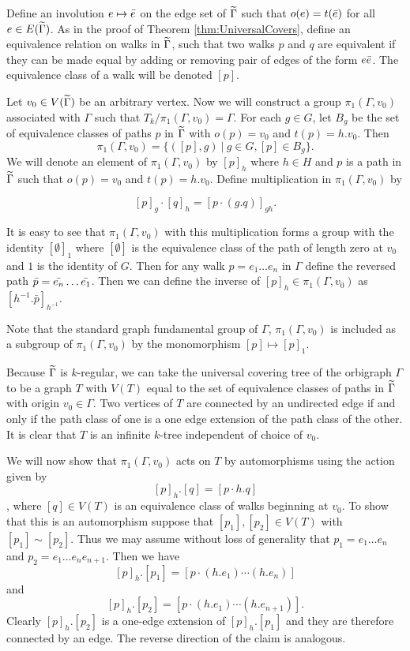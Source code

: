 Define an involution $e \mapsto \bar{e}$ on the edge set of $\widetilde{\Gamma}$ such that $o(e) = t(\bar{e})$ for all $e \in E(\widetilde{\Gamma})$. As in the proof of Theorem \ref{thm:UniversalCovers}, define an equivalence relation on walks in $\widetilde{\Gamma}$, such that two walks $p$ and $q$ are equivalent if they can be made equal by adding or removing pair of edges of the form $e\bar{e}$. The equivalence class of a walk will be denoted $[p]$.

Let $ v_0 \in V(\widetilde{\Gamma}) $ be an arbitrary vertex. Now we will construct a group $\pi_1(\Gamma, v_0)$ associated with $\Gamma$ such that $T_k / \pi_1(\Gamma, v_0) = \Gamma$. For each $ g \in G $, let $ B_g $ be the set of equivalence classes of paths $ p $ in $\widetilde{\Gamma}$ with $ o(p) = v_0 $ and $ t(p) = h . v_0 $. Then 
$$ 
    \pi_1(\Gamma, v_0) = \lbrace ([p], g) \ \vert \ g \in G, [p] \in B_g \rbrace.
$$
We will denote an element of $ \pi_1(\Gamma, v_0) $ by $ [p]_h $ where $ h \in H $ and $ p $ is a path in $ \widetilde{\Gamma} $ such that $ o(p) = v_0 $ and $ t(p) = h . v_0 $. Define multiplication in $ \pi_1(\Gamma, v_0) $ by

$$
    [p]_{g} \cdot [q]_{h} = [p \cdot (g . q)]_{g h}.
$$

It is easy to see that $\pi_1(\Gamma, v_0)$ with this multiplication forms a group with the identity $[\emptyset]_1$ where $[\emptyset]$ is the equivalence class of the path of length zero at $v_0$ and $1$ is the identity of $G$. Then for any walk $ p = e_1 \ldots e_n $ in $ \Gamma $ define the reversed path $ \bar{p} = \bar{e_n} \ldots \bar{e_1} $. Then we can define the inverse of $[p]_h \in \pi_1(\Gamma, v_0)$ as $[h^{-1} . \bar p]_{h^{-1}}$.

Note that the standard graph fundamental group of $ \Gamma $, $\pi_1(\Gamma, v_0) $ is included as a subgroup of $\pi_1(\Gamma, v_0)$ by the monomorphism $[p] \mapsto [p]_1 $.

Because $\widetilde{\Gamma}$ is $k$-regular, we can take the universal covering tree of the orbigraph $\Gamma$ to be a graph $T$ with $V(T)$ equal to the set of equivalence classes of paths in $\widetilde{\Gamma}$ with origin $v_0 \in \Gamma$. Two vertices of $T$ are connected by an undirected edge if and only if the path class of one is a one edge extension of the path class of the other. It is clear that $T$ is an infinite $k$-tree independent of choice of $v_0$.

We will now show that $\pi_1(\Gamma, v_0)$ acts on $T$ by automorphisms using the action given by
$$
    [p]_h . [q] = [p \cdot h . q]
$$, where $[q] \in V(T)$ is an equivalence class of walks beginning at $v_0$. To show that this is an automorphism suppose that $[p_1], [p_2] \in V(T)$ with $[p_1] \sim [p_2]$. Thus we may assume without loss of generality that $p_1 = e_1 \ldots e_n$ and $p_2 = e_1 \ldots e_n e_{n+1}$. Then we have
$$
    [p]_h . [p_1] = [p \cdot (h . e_1) \cdots (h . e_n)]
$$
and 
$$
    [p]_h . [p_2] = [p \cdot (h . e_1) \cdots (h . e_{n+1})].
$$
Clearly $[p]_h . [p_2]$ is a one-edge extension of $[p]_h . [p_1]$ and they are therefore connected by an edge. The reverse direction of the claim is analogous. 

